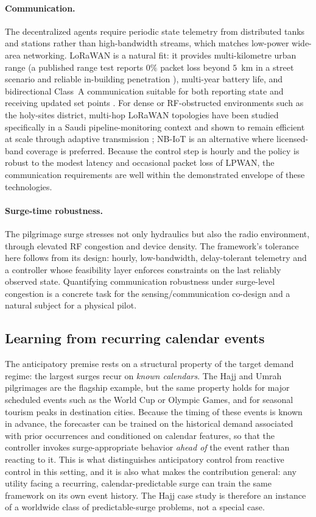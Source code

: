 \documentclass[11pt,a4paper]{article}
\begin{document}
\paragraph{Communication.} The decentralized agents require periodic state
telemetry from distributed tanks and stations rather than high-bandwidth streams,
which matches low-power wide-area networking. {LoRaWAN} is a natural fit: it
provides multi-kilometre urban range (a published range test reports $0\%$ packet
loss beyond $5$~km in a street scenario and reliable in-building penetration
\citep{RAK2025RangeTest}), multi-year battery life, and bidirectional Class~A
communication suitable for both reporting state and receiving updated set points
\citep{Khairullah2025LoRaWANReview}. For dense or RF-obstructed environments such as
the holy-sites district, multi-hop {LoRaWAN} topologies have been studied
specifically in a Saudi pipeline-monitoring context and shown to remain efficient
at scale through adaptive transmission \citep{Abdelfadeel2020SaudiPipeline};
{NB-IoT} is an alternative where licensed-band coverage is preferred. Because the
control step is hourly and the policy is robust to the modest latency and
occasional packet loss of LPWAN, the communication requirements are well within
the demonstrated envelope of these technologies.

\paragraph{Surge-time robustness.} The pilgrimage surge stresses not only
hydraulics but also the radio environment, through elevated RF congestion and
device density. The framework's tolerance here follows from its design: hourly,
low-bandwidth, delay-tolerant telemetry and a controller whose feasibility layer
enforces constraints on the last reliably observed state. Quantifying
communication robustness under surge-level congestion is a concrete task for the
sensing/communication co-design and a natural subject for a physical pilot.

\subsection{Learning from recurring calendar events}
\label{sec:recurring}
The anticipatory premise rests on a structural property of the target demand
regime: the largest surges recur on \emph{known calendars}. The Hajj and Umrah
pilgrimages are the flagship example, but the same property holds for major
scheduled events such as the World Cup or Olympic Games, and for seasonal tourism
peaks in destination cities. Because the timing of these events is known in
advance, the forecaster can be trained on the historical demand associated with
prior occurrences and conditioned on calendar features, so that the controller
invokes surge-appropriate behavior \emph{ahead of} the event rather than reacting
to it. This is what distinguishes anticipatory control from reactive control in
this setting, and it is also what makes the contribution general: any utility
facing a recurring, calendar-predictable surge can train the same framework on
its own event history. The Hajj case study is therefore an instance of a
worldwide class of predictable-surge problems, not a special case.
\end{document}
